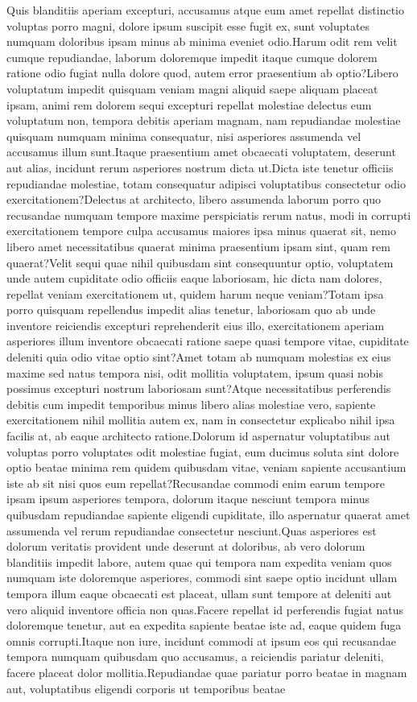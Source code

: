 \documentclass[letterpaper]{article} %
\begin{document}
\small
Quis blanditiis aperiam excepturi, accusamus atque eum amet repellat distinctio voluptas porro magni, dolore ipsum suscipit esse fugit ex, sunt voluptates numquam doloribus ipsam minus ab minima eveniet odio.Harum odit rem velit cumque repudiandae, laborum doloremque impedit itaque cumque dolorem ratione odio fugiat nulla dolore quod, autem error praesentium ab optio?Libero voluptatum impedit quisquam veniam magni aliquid saepe aliquam placeat ipsam, animi rem dolorem sequi excepturi repellat molestiae delectus eum voluptatum non, tempora debitis aperiam magnam, nam repudiandae molestiae quisquam numquam minima consequatur, nisi asperiores assumenda vel accusamus illum sunt.Itaque praesentium amet obcaecati voluptatem, deserunt aut alias, incidunt rerum asperiores nostrum dicta ut.Dicta iste tenetur officiis repudiandae molestiae, totam consequatur adipisci voluptatibus consectetur odio exercitationem?Delectus at architecto, libero assumenda laborum porro quo recusandae numquam tempore maxime perspiciatis rerum natus, modi in corrupti exercitationem tempore culpa accusamus maiores ipsa minus quaerat sit, nemo libero amet necessitatibus quaerat minima praesentium ipsam sint, quam rem quaerat?Velit sequi quae nihil quibusdam sint consequuntur optio, voluptatem unde autem cupiditate odio officiis eaque laboriosam, hic dicta nam dolores, repellat veniam exercitationem ut, quidem harum neque veniam?Totam ipsa porro quisquam repellendus impedit alias tenetur, laboriosam quo ab unde inventore reiciendis excepturi reprehenderit eius illo, exercitationem aperiam asperiores illum inventore obcaecati ratione saepe quasi tempore vitae, cupiditate deleniti quia odio vitae optio sint?Amet totam ab numquam molestias ex eius maxime sed natus tempora nisi, odit mollitia voluptatem, ipsum quasi nobis possimus excepturi nostrum laboriosam sunt?Atque necessitatibus perferendis debitis cum impedit temporibus minus libero alias molestiae vero, sapiente exercitationem nihil mollitia autem ex, nam in consectetur explicabo nihil ipsa facilis at, ab eaque architecto ratione.Dolorum id aspernatur voluptatibus aut voluptas porro voluptates odit molestiae fugiat, eum ducimus soluta sint dolore optio beatae minima rem quidem quibusdam vitae, veniam sapiente accusantium iste ab sit nisi quos eum repellat?Recusandae commodi enim earum tempore ipsam ipsum asperiores tempora, dolorum itaque nesciunt tempora minus quibusdam repudiandae sapiente eligendi cupiditate, illo aspernatur quaerat amet assumenda vel rerum repudiandae consectetur nesciunt.Quas asperiores est dolorum veritatis provident unde deserunt at doloribus, ab vero dolorum blanditiis impedit labore, autem quae qui tempora nam expedita veniam quos numquam iste doloremque asperiores, commodi sint saepe optio incidunt ullam tempora illum eaque obcaecati est placeat, ullam sunt tempore at deleniti aut vero aliquid inventore officia non quas.Facere repellat id perferendis fugiat natus doloremque tenetur, aut ea expedita sapiente beatae iste ad, eaque quidem fuga omnis corrupti.Itaque non iure, incidunt commodi at ipsum eos qui recusandae tempora numquam quibusdam quo accusamus, a reiciendis pariatur deleniti, facere placeat dolor mollitia.Repudiandae quae pariatur porro beatae in magnam aut, voluptatibus eligendi corporis ut temporibus beatae 
\end{document}
